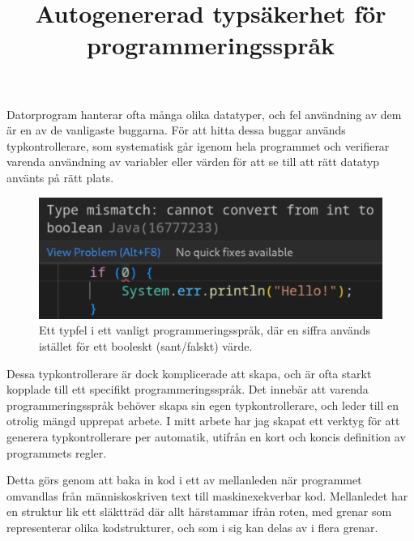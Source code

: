 \documentclass{popsci}
\title{Autogenererad typsäkerhet för programmeringsspråk}
\begin{document}


{\noindent
Datorprogram hanterar ofta många olika datatyper, och fel användning av dem är en av de vanligaste buggarna.
För att hitta dessa buggar används typkontrollerare, som systematisk går igenom hela programmet och verifierar varenda användning av variabler eller värden för att se till att rätt datatyp använts på rätt plats.

\begin{figure}[!bth] %
\includegraphics[width=\columnwidth]{typeerror.png}
\caption*{Ett typfel i ett vanligt programmeringsspråk, där en siffra används istället för ett booleskt (sant/falskt) värde.}
\end{figure}

Dessa typkontrollerare är dock komplicerade att skapa, och är ofta starkt kopplade till ett specifikt programmeringsspråk.
Det innebär att varenda programmeringsspråk behöver skapa sin egen typkontrollerare, och leder till en otrolig mängd upprepat arbete.
I mitt arbete har jag skapat ett verktyg för att generera typkontrollerare per automatik, utifrån en kort och koncis definition av programmets regler.

Detta görs genom att baka in kod i ett av mellanleden när programmet omvandlas från människoskriven text till maskinexekverbar kod.
Mellanledet har en struktur lik ett släktträd där allt härstammar ifrån roten, med grenar som representerar olika kodstrukturer, och som i sig kan delas av i flera grenar.


}
\end{document}
